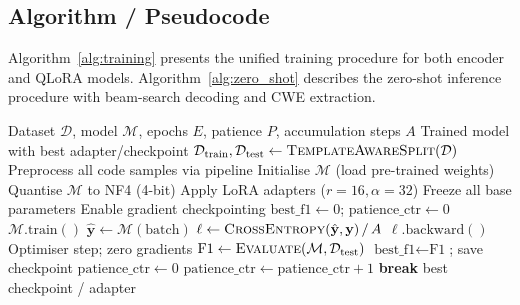 \subsection{Algorithm / Pseudocode}
\label{sec:pseudocode}

Algorithm~\ref{alg:training} presents the unified training procedure for
both encoder and QLoRA models.  Algorithm~\ref{alg:zero_shot} describes
the zero-shot inference procedure with beam-search decoding and CWE
extraction.

\begin{algorithm}[t]
\caption{Encoder / QLoRA Training Procedure}
\label{alg:training}
\begin{algorithmic}[1]
\REQUIRE Dataset $\mathcal{D}$, model $\mathcal{M}$, epochs $E$,
         patience $P$, accumulation steps $A$
\ENSURE Trained model with best adapter/checkpoint
\STATE $\mathcal{D}_{\text{train}}, \mathcal{D}_{\text{test}}
       \leftarrow \textsc{TemplateAwareSplit}(\mathcal{D})$
\STATE Preprocess all code samples via pipeline
\STATE Initialise $\mathcal{M}$ (load pre-trained weights)
    \STATE Quantise $\mathcal{M}$ to NF4 (4-bit)
    \STATE Apply LoRA adapters ($r\!=\!16, \alpha\!=\!32$)
    \STATE Freeze all base parameters
    \STATE Enable gradient checkpointing
\ENDIF
\STATE $\text{best\_f1} \leftarrow 0$; $\text{patience\_ctr} \leftarrow 0$
    \STATE $\mathcal{M}.\text{train}()$
        \STATE $\hat{\mathbf{y}} \leftarrow \mathcal{M}(\text{batch})$
        \STATE $\ell \leftarrow \textsc{CrossEntropy}(\hat{\mathbf{y}},
               \mathbf{y}) \,/\, A$
        \STATE $\ell.\text{backward}()$
            \STATE Optimiser step; zero gradients
        \ENDIF
    \ENDFOR
    \STATE $\text{F1} \leftarrow \textsc{Evaluate}(\mathcal{M},
           \mathcal{D}_{\text{test}})$
        \STATE $\text{best\_f1} \leftarrow \text{F1}$;
               save checkpoint
        \STATE $\text{patience\_ctr} \leftarrow 0$
    \ELSE
        \STATE $\text{patience\_ctr} \leftarrow
               \text{patience\_ctr} + 1$
    \ENDIF
        \STATE \textbf{break} 
    \ENDIF
\ENDFOR
\RETURN best checkpoint / adapter
\end{algorithmic}
\end{algorithm}

